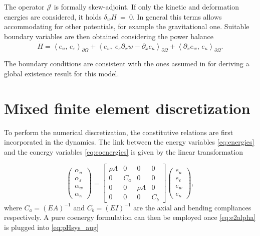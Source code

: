 \documentclass{ifacconf}
\newcommand{\inner}[3][]{\ensuremath{\left\langle #2, \, #3 \right\rangle_{#1}}}
\begin{document}
The operator $\mathcal{J}$ is formally skew-adjoint. If only the kinetic and deformation energies are considered, it holds $\delta_{w} H~=~0$. In general this terms allows accommodating for other potentials, for example the gravitational one. Suitable boundary variables are then obtained considering the power balance
\begin{equation}
	\dot{H} = \inner[\partial\Omega]{e_u}{e_\varepsilon} + \inner[\partial\Omega]{e_w}{e_\varepsilon \partial_x w -\partial_x e_\kappa} + \inner[\partial\Omega]{\partial_x e_w}{e_\kappa}.
\end{equation}

The boundary conditions are consistent with the ones assumed in \cite{puel1996} for deriving a global existence result for this model.


\section{Mixed finite element discretization}\label{sec:mfem}
To perform the numerical discretization, the constitutive relations are first incorporated in the dynamics. The link between the energy variables \eqref{eq:energies} and the conergy variables \eqref{eq:coenergies} is given by the linear transformation

\begin{equation}\label{eq:e2alpha}
	\begin{pmatrix}
		\alpha_u \\ \alpha_\varepsilon \\ \alpha_w \\ \alpha_\kappa
	\end{pmatrix} =
	\begin{bmatrix}
	\rho A & 0 & 0 & 0 \\
	0 & C_a & 0 & 0 \\
	0 & 0 & \rho A & 0 \\
	0 & 0 & 0 & C_b
	\end{bmatrix}
	\begin{pmatrix}
		e_u \\ e_\varepsilon \\ e_w \\ e_{\kappa}
	\end{pmatrix},
\end{equation}
where $C_a = (EA)^{-1}$ and $C_b = (EI)^{-1}$ are the axial and bending compliances respectively. A pure coenergy formulation can then be employed once \eqref{eq:e2alpha} is plugged into \eqref{eq:pHsys_aug}
\end{document}
